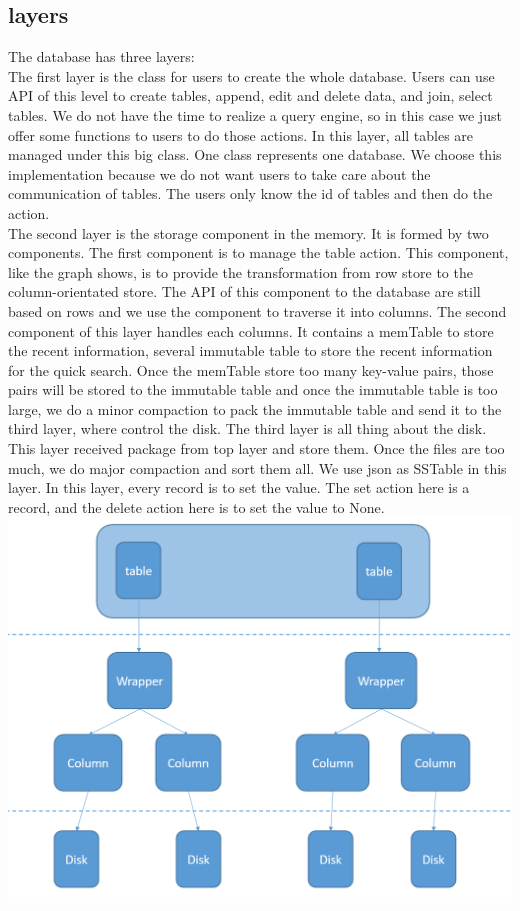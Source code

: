 \documentclass[a4paper]{article}
\begin{document}
\subsection{layers}
The database has three layers:\\
The first layer is the class for users to create the whole database. Users can use API of this level to create tables, append, edit and delete data, and join, select tables. We do not have the time to realize a query engine, so in this case we just offer some functions to users to do those actions. In this layer, all tables are managed under this big class. One class represents one database. We choose this implementation because we do not want users to take care about the communication of tables. The users only know the id of tables and then do the action.\\
The second layer is the storage component in the memory. It is formed by two components. The first component is to manage the table action. This component, like the graph shows, is to provide the transformation from row store to the column-orientated store. The API of this component to the database are still based on rows and we use the component to traverse it into columns. The second component of this layer handles each columns. It contains a memTable to store the recent information, several immutable table to store the recent information for the quick search. Once the memTable store too many key-value pairs, those pairs will be stored to the immutable table and once the immutable table is too large, we do a minor compaction to pack the immutable table and send it to the third layer, where control the disk.
The third layer is all thing about the disk. This layer received package from top layer and store them. Once the files are too much, we do major compaction and sort them all. We use json as SSTable in this layer. In this layer, every record is to set the value. The set action here is a record, and the delete action here is to set the value to None.
\\
  \includegraphics[width=1.0\linewidth]{cse291-1.png}\\
\end{document}
